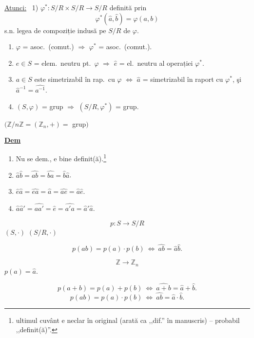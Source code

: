 \bigskip
\noindent\underline{Atunci:} \ 1) $\varphi^* : S/R\times S/R \to S/R$ definită prin
\[
\varphi^*(\hat a,\hat b) = \varphi(a,b)
\]
s.n. legea de compoziție indusă pe $S/R$ de $\varphi$.

\begin{enumerate}
\item[(2)] $\varphi$ = asoc.\ (comut.) $\Rightarrow$ $\varphi^*$ = asoc.\ (comut.).
\item[(3)] $e\in S$ = elem.\ neutru pt.\ $\varphi$ $\Rightarrow$ $\hat e$ = el.\ neutru al operației $\varphi^*$.
\item[(4)] $a\in S$ este simetrizabil în rap.\ cu $\varphi$ $\Leftrightarrow$ $\hat a$ = simetrizabil în raport cu $\varphi^*$, şi $\hat a^{-1} = \widehat{a^{-1}}$.
\item[(5)] $(S,\varphi)$ = grup $\Rightarrow$ $(S/R,\varphi^*)$ = grup.
\end{enumerate}

\noindent $\big(\mathbb{Z}/n\mathbb{Z} = (\mathbb{Z}_n,+) = $ grup$\big)$

\bigskip
\noindent\underline{\textbf{Dem}}

\begin{enumerate}
\item[(1)] Nu se dem., e bine definit(ă).\footnote{ultimul cuvânt e neclar în original (arată ca ,,dif.'' în manuscris) -- probabil ,,definit(ă)''.}
\item[(2)] $\hat a\hat b = \widehat{ab} = \widehat{ba} = \hat b\hat a$.
\item[(3)] $\hat e\hat a = \widehat{ea} = \hat a = \widehat{ae} = \hat a\hat e$.
\item[(4)] $\hat a\hat a' = \widehat{aa'} = \hat e = \widehat{a'a} = \hat a'\hat a$.
\end{enumerate}

\[
p : S \to S/R
\]
\noindent $(S,\cdot)$ \hspace{2cm} $(S/R,\cdot)$

\[
p(ab) = p(a)\cdot p(b) \ \Leftrightarrow\ \widehat{ab} = \hat a\hat b.
\]

\[
\mathbb{Z} \to \mathbb{Z}_n
\]
\noindent $p(a) = \hat a$.

\[
p(a+b) = p(a)+p(b) \ \Leftrightarrow\ \widehat{a+b} = \hat a+\hat b.
\]
\[
p(ab) = p(a)\cdot p(b) \ \Leftrightarrow\ \widehat{ab} = \hat a\cdot\hat b.
\]
